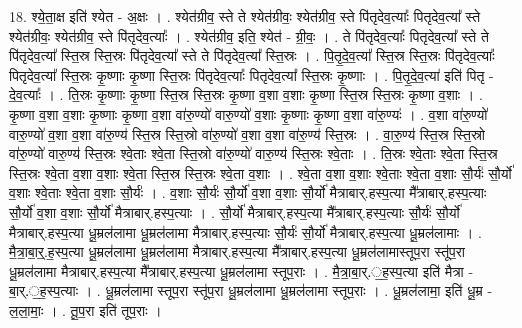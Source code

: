 \documentclass[17pt]{extarticle}
\begin{document}
18. श्ये॒ता॒क्ष इति॑ श्येत - अ॒क्षः । . श्येत॑ग्रीव॒ स्ते ते श्येत॑ग्रीवः॒ श्येत॑ग्रीव॒ स्ते पि॑तृदेव॒त्याः᳚ पितृदेव॒त्या᳚ स्ते श्येत॑ग्रीवः॒ श्येत॑ग्रीव॒ स्ते पि॑तृदेव॒त्याः᳚ । . श्येत॑ग्रीव॒ इति॒ श्येत॑ - ग्री॒वः॒ । . ते पि॑तृदेव॒त्याः᳚ पितृदेव॒त्या᳚ स्ते ते पि॑तृदेव॒त्या᳚ स्ति॒स्र स्ति॒स्रः पि॑तृदेव॒त्या᳚ स्ते ते पि॑तृदेव॒त्या᳚ स्ति॒स्रः । . पि॒तृ॒दे॒व॒त्या᳚ स्ति॒स्र स्ति॒स्रः पि॑तृदेव॒त्याः᳚ पितृदेव॒त्या᳚ स्ति॒स्रः कृ॒ष्णाः कृ॒ष्णा स्ति॒स्रः पि॑तृदेव॒त्याः᳚ पितृदेव॒त्या᳚ स्ति॒स्रः कृ॒ष्णाः । . पि॒तृ॒दे॒व॒त्या॑ इति॑ पितृ - दे॒व॒त्याः᳚ । . ति॒स्रः कृ॒ष्णाः कृ॒ष्णा स्ति॒स्र स्ति॒स्रः कृ॒ष्णा व॒शा व॒शाः कृ॒ष्णा स्ति॒स्र स्ति॒स्रः कृ॒ष्णा व॒शाः । . कृ॒ष्णा व॒शा व॒शाः कृ॒ष्णाः कृ॒ष्णा व॒शा वा॑रु॒ण्यो॑ वारु॒ण्यो॑ व॒शाः कृ॒ष्णाः कृ॒ष्णा व॒शा वा॑रु॒ण्यः॑ । . व॒शा वा॑रु॒ण्यो॑ वारु॒ण्यो॑ व॒शा व॒शा वा॑रु॒ण्य॑ स्ति॒स्र स्ति॒स्रो वा॑रु॒ण्यो॑ व॒शा व॒शा वा॑रु॒ण्य॑ स्ति॒स्रः । . वा॒रु॒ण्य॑ स्ति॒स्र स्ति॒स्रो वा॑रु॒ण्यो॑ वारु॒ण्य॑ स्ति॒स्रः श्वे॒ताः श्वे॒ता स्ति॒स्रो वा॑रु॒ण्यो॑ वारु॒ण्य॑ स्ति॒स्रः श्वे॒ताः । . ति॒स्रः श्वे॒ताः श्वे॒ता स्ति॒स्र स्ति॒स्रः श्वे॒ता व॒शा व॒शाः श्वे॒ता स्ति॒स्र स्ति॒स्रः श्वे॒ता व॒शाः । . श्वे॒ता व॒शा व॒शाः श्वे॒ताः श्वे॒ता व॒शाः सौ॒र्यः॑ सौ॒र्यो॑ व॒शाः श्वे॒ताः श्वे॒ता व॒शाः सौ॒र्यः॑ । . व॒शाः सौ॒र्यः॑ सौ॒र्यो॑ व॒शा व॒शाः सौ॒र्यो॑ मैत्राबार्.हस्प॒त्या मै᳚त्राबार्.हस्प॒त्याः सौ॒र्यो॑ व॒शा व॒शाः सौ॒र्यो॑ मैत्राबार्.हस्प॒त्याः । . सौ॒र्यो॑ मैत्राबार्.हस्प॒त्या मै᳚त्राबार्.हस्प॒त्याः सौ॒र्यः॑ सौ॒र्यो॑ मैत्राबार्.हस्प॒त्या धू॒म्रल॑लामा धू॒म्रल॑लामा मैत्राबार्.हस्प॒त्याः सौ॒र्यः॑ सौ॒र्यो॑ मैत्राबार्.हस्प॒त्या धू॒म्रल॑लामाः । . मै॒त्रा॒बा॒र्॒.ह॒स्प॒त्या धू॒म्रल॑लामा धू॒म्रल॑लामा मैत्राबार्.हस्प॒त्या मै᳚त्राबार्.हस्प॒त्या धू॒म्रल॑लामास्तूप॒रा स्तू॑प॒रा धू॒म्रल॑लामा मैत्राबार्.हस्प॒त्या मै᳚त्राबार्.हस्प॒त्या धू॒म्रल॑लामा स्तूप॒राः । . मै॒त्रा॒बा॒र्.॒ह॒स्प॒त्या इति॑ मैत्रा - बा॒र्.॒ह॒स्प॒त्याः । . धू॒म्रल॑लामा स्तूप॒रा स्तू॑प॒रा धू॒म्रल॑लामा धू॒म्रल॑लामा स्तूप॒राः । . धू॒म्रल॑लामा॒ इति॑ धू॒म्र - ल॒ला॒माः॒ । . तू॒प॒रा इति॑ तूप॒राः । \newline
\pagebreak
{}
\end{document}
